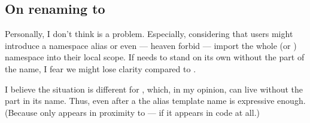 \subsection{On renaming  to }
Personally, I don't think \std{} is a problem.
Especially, considering that users might introduce a namespace alias or even
--- heaven forbid --- import the whole \std{} (or
\std{}) namespace into their local scope.
If  needs to stand on its own without the  part of the
name, I fear we might lose clarity compared to .

I believe the situation is different for \std{}, which,
in my opinion, can live without the  part in its name.
Thus, even after a  the alias template name
 is expressive enough.
(Because  only appears in proximity to  --- if it
appears in code at all.)
